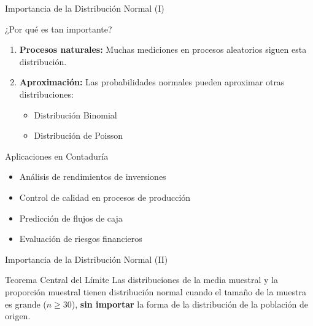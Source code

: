 \documentclass[10pt]{beamer}
\begin{document}
\begin{frame}{Importancia de la Distribución Normal (I)}
\begin{block}{¿Por qué es tan importante?}
\begin{enumerate}
  \item \textbf{Procesos naturales:} Muchas mediciones en procesos aleatorios siguen esta distribución.
  \item \textbf{Aproximación:} Las probabilidades normales pueden aproximar otras distribuciones:
  \begin{itemize}
    \item Distribución Binomial
    \item Distribución de Poisson
  \end{itemize}
\end{enumerate}
\end{block}

\vspace{0.2cm}
\begin{exampleblock}{Aplicaciones en Contaduría}
\begin{itemize}
  \item Análisis de rendimientos de inversiones
  \item Control de calidad en procesos de producción
  \item Predicción de flujos de caja
  \item Evaluación de riesgos financieros
\end{itemize}
\end{exampleblock}
\end{frame}

\begin{frame}{Importancia de la Distribución Normal (II)}
\begin{block}{Teorema Central del Límite}
Las distribuciones de la media muestral y la proporción muestral tienen distribución normal cuando el tamaño de la muestra es grande ($n \geq 30$), \textbf{sin importar} la forma de la distribución de la población de origen.
\end{block}

\vspace{0.3cm}
\begin{center}
\end{center}
\end{frame}
\end{document}
